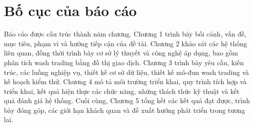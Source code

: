 \section{Bố cục của báo cáo}
\label{sec:bo_cuc}

Báo cáo được cấu trúc thành năm chương. Chương 1 trình bày bối cảnh, vấn đề, mục tiêu, phạm vi và hướng tiếp cận của đề tài. Chương 2 khảo sát các hệ thống liên quan, đồng thời trình bày cơ sở lý thuyết và công nghệ áp dụng, bao gồm phân tích wash trading bằng đồ thị giao dịch. Chương 3 trình bày yêu cầu, kiến trúc, các luồng nghiệp vụ, thiết kế cơ sở dữ liệu, thiết kế mô-đun wash trading và kế hoạch kiểm thử. Chương 4 mô tả môi trường triển khai, quy trình tích hợp và triển khai, kết quả hiện thực các chức năng, những thách thức kỹ thuật và kết quả đánh giá hệ thống. Cuối cùng, Chương 5 tổng kết các kết quả đạt được, trình bày đóng góp, các giới hạn khách quan và đề xuất hướng phát triển trong tương lai.